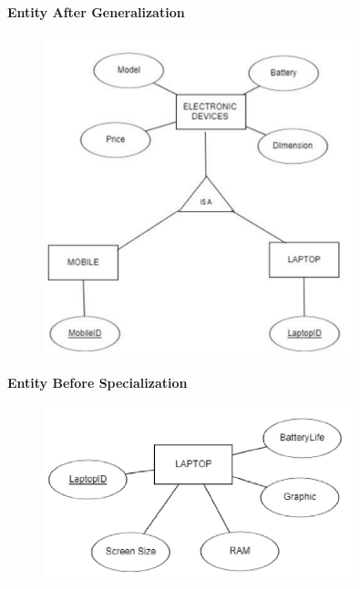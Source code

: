 \documentclass[a4paper, 12pt]{article}
\begin{document}
       \textbf{Entity After Generalization} %
       \begin{figure}[H]
        \includegraphics[width=0.8\textwidth]{chapter2c_5.png}
       \end{figure}

       \vspace{2cm}
       \textbf{Entity Before Specialization} %
       \begin{figure}[H]
        \includegraphics[width=0.8\textwidth]{chapter2c_6.png}
       \end{figure}
\end{document}
